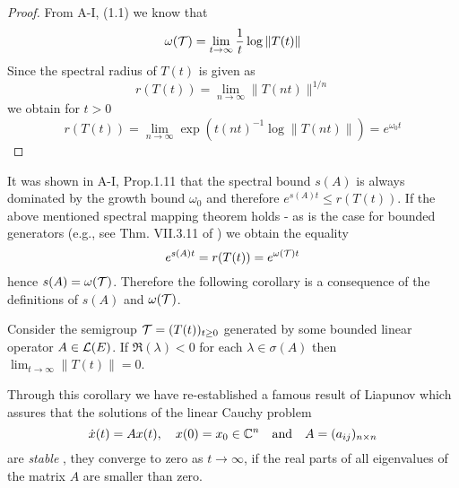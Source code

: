 \begin{proof}
From A-I, (1.1) we know that
\[
    \omega(\mathcal{T}) = \lim_{t \to \infty} \frac{1}{t} \log \|T(t)\|
\]
Since the spectral radius of $T(t)$ is given as
\[
    r(T(t)) = \lim_{n \to \infty} \|T(nt)\|^{1/n}
\]
we obtain for $t > 0$
\[
    r(T(t)) = \lim_{n \to \infty} \exp(t(nt)^{-1} \log \|T(nt)\|) = e^{\omega_{0} t}
\]
\end{proof}
It was shown in A-I, Prop.1.11 that the spectral bound $s(A)$ is always dominated by the growth bound $\omega_{0}$ and therefore $e^{s(A)t} \leq r(T(t))$.
If the above mentioned spectral mapping theorem holds - as is the case for bounded generators (e.g., see Thm. VII.3.11 of \citet{dunfordschwartz:1958}) we obtain the equality
\[
    e^{s(A)t} = r(T(t)) = e^{\omega(\mathcal{T}) t}
\]
hence $s(A) = \omega(\mathcal{T})$.
Therefore the following corollary is a consequence of the definitions of $s(A)$ and $\omega(\mathcal{T})$.
\begin{corollary}\label{cor:a3-1.2}
Consider the semigroup $\mathcal{T} = (T(t))_{t \geq 0}$ generated by some bounded linear operator $A \in \mathcal{L}(E)$.
If $\Re(\lambda) < 0$ for each $\lambda \in \sigma(A)$ then $\lim_{t \to \infty}\|T(t)\| = 0$.
\end{corollary}
Through this corollary we have re-established a famous result of Liapunov which assures that the solutions of the linear Cauchy problem
\[
    \dot{x}(t) = Ax(t), \quad x(0) = x_{0} \in \mathbb{C}^{n} \quad \text{and} \quad A = (a_{ij})_{n\times n}
\]
are \emph{stable} \ie, they converge to zero as $t \to \infty$, if the real parts of all eigenvalues of the matrix $A$ are smaller than zero.

